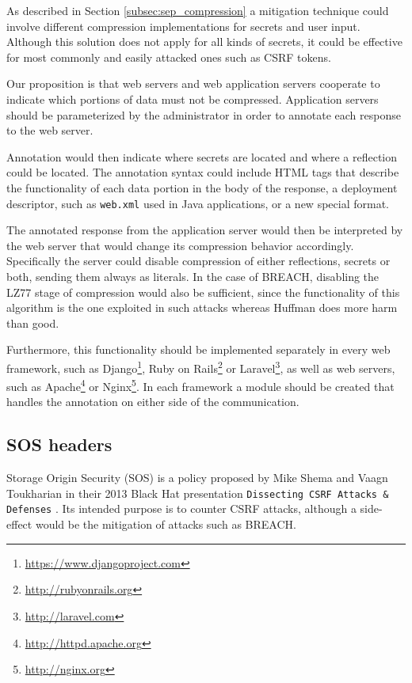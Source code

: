 As described in Section \ref{subsec:sep_compression} a mitigation technique
could involve different compression implementations for secrets and user input.
Although this solution does not apply for all kinds of secrets, it could be
effective for most commonly and easily attacked ones such as CSRF tokens.

Our proposition is that web servers and web application servers cooperate to
indicate which portions of data must not be compressed. Application servers
should be parameterized by the administrator in order to annotate each response
to the web server.

Annotation would then indicate where secrets are located and where a reflection
could be located. The annotation syntax could include HTML tags that describe
the functionality of each data portion in the body of the response, a deployment
descriptor, such as \texttt{web.xml} used in Java applications, or a new special
format.

The annotated response from the application server would then be interpreted by
the web server that would change its compression behavior accordingly.
Specifically the server could disable compression of either reflections, secrets
or both, sending them always as literals. In the case of BREACH, disabling the
LZ77 stage of compression would also be sufficient, since the functionality of
this algorithm is the one exploited in such attacks whereas Huffman does more
harm than good.

Furthermore, this functionality should be implemented separately in every web
framework, such as Django\footnote{\url{https://www.djangoproject.com}}, Ruby on
Rails\footnote{\url{http://rubyonrails.org}} or
Laravel\footnote{\url{http://laravel.com}}, as well as web servers, such as
Apache\footnote{\url{http://httpd.apache.org}} or
Nginx\footnote{\url{http://nginx.org}}. In each framework a module should be
created that handles the annotation on either side of the communication.

\subsection{SOS headers}\label{subsec:sos}

Storage Origin Security (SOS) is a policy proposed by Mike Shema and Vaagn
Toukharian in their 2013 Black Hat presentation \texttt{Dissecting CSRF Attacks
\& Defenses} \cite{sos}. Its intended purpose is to counter CSRF attacks,
although a side-effect would be the mitigation of attacks such as BREACH.

